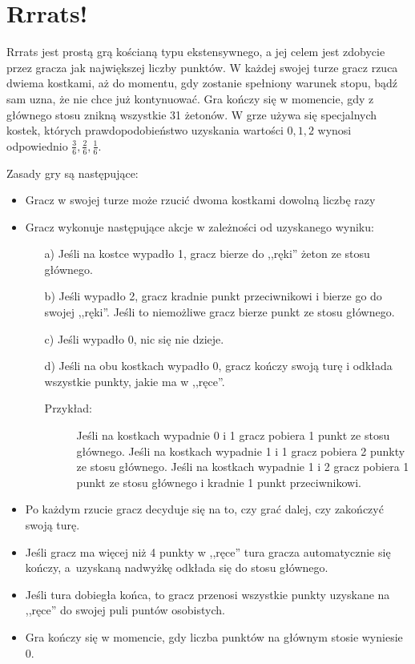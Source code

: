 \documentclass[inzynierska]{pwr_wmat_praca_dyplomowa}
\theoremstyle{plain}
\numberwithin{theorem}{chapter}
\theoremstyle{definition}
\numberwithin{theorem}{chapter}
\begin{document}
	\section{Rrrats!}
	Rrrats jest prostą grą kościaną typu ekstensywnego, a jej celem jest zdobycie przez gracza jak największej liczby punktów. W każdej swojej turze gracz rzuca dwiema kostkami, aż do momentu, gdy zostanie spełniony warunek stopu, bądź sam uzna, że nie chce już kontynuować. Gra kończy się w momencie, gdy z głównego stosu znikną wszystkie 31 żetonów. W grze używa się specjalnych kostek, których prawdopodobieństwo uzyskania wartości $0, 1, 2$ wynosi odpowiednio $\frac{3}{6}, \frac{2}{6}, \frac{1}{6}$.

	Zasady gry są następujące:
	\begin{itemize}[]
		\item Gracz w swojej turze może rzucić dwoma kostkami dowolną liczbę razy
		\item  Gracz wykonuje następujące akcje w zależności od uzyskanego wyniku:
		\begin{enumerate}
			\item[a)] Jeśli na kostce wypadło 1, gracz bierze do ,,ręki'' żeton ze stosu głównego.
			\item[b)] Jeśli wypadło 2, gracz kradnie punkt przeciwnikowi i bierze go do swojej ,,ręki''. Jeśli to niemożliwe gracz bierze punkt ze stosu głównego. 
			\item[c)] Jeśli wypadło 0, nic się nie dzieje.
			\item[d)] Jeśli na obu kostkach wypadło 0, gracz kończy swoją turę i odkłada wszystkie punkty, jakie ma w ,,ręce''.
			\begin{description}
				\item[Przykład:] Jeśli na kostkach wypadnie 0 i 1 gracz pobiera 1 punkt ze stosu głównego. Jeśli na kostkach wypadnie 1 i 1 gracz pobiera 2 punkty ze stosu głównego. Jeśli na kostkach wypadnie 1 i 2 gracz pobiera 1 punkt ze stosu głównego i kradnie 1 punkt przeciwnikowi. 
			\end{description}		
		\end{enumerate}
		\item Po każdym rzucie gracz decyduje się na to, czy grać dalej, czy zakończyć swoją turę.
		
		\item Jeśli gracz ma więcej niż 4 punkty w ,,ręce'' tura gracza automatycznie się kończy, a~uzyskaną nadwyżkę odkłada się do stosu głównego.
		
		\item Jeśli tura dobiegła końca, to gracz przenosi wszystkie punkty uzyskane na ,,ręce'' do swojej puli puntów osobistych.
		
		\item Gra kończy się w momencie, gdy liczba punktów na głównym stosie wyniesie 0.
	\end{itemize}
\end{document}
